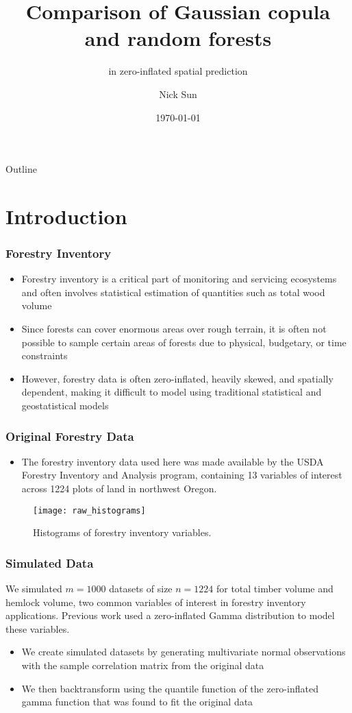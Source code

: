 \documentclass{beamer}
\title{Comparison of Gaussian copula and random forests}
\subtitle{in zero-inflated spatial prediction}
\author{Nick Sun}
\institute{Oregon State University, Department of Statistics}
\date{\today}
\begin{document}
\begin{frame}
\titlepage
\end{frame}

\begin{frame}{Outline}
	\tableofcontents
\end{frame}

\section{Introduction}
\begin{frame}
\frametitle{Forestry Inventory}
\begin{itemize}
	\item Forestry inventory is a critical part of monitoring and servicing ecosystems and often involves statistical estimation of quantities such as total wood volume
	\item Since forests can cover enormous areas over rough terrain, it is often not possible to sample certain areas of forests due to physical, budgetary, or time constraints
	\item However, forestry data is often zero-inflated, heavily skewed, and spatially dependent, making it difficult to model using traditional statistical and geostatistical models
\end{itemize}
\end{frame}

\begin{frame}
	\frametitle{Original Forestry Data}
	\begin{itemize}
		\item  The forestry inventory data used here was made available by the USDA Forestry Inventory and Analysis program, containing 13 variables of interest across 1224 plots of land in northwest Oregon.
	\end{itemize}
	\begin{center}
		\begin{figure}
		\texttt{[image: raw\_histograms]}
		\caption{Histograms of forestry inventory variables.}
		\end{figure}
	\end{center}
\end{frame}

\begin{frame}
	\frametitle{Simulated Data}
	We simulated $m=1000$ datasets of size $n=1224$ for total timber volume and hemlock volume, two common variables of interest in forestry inventory applications.
	Previous work used a zero-inflated Gamma distribution to model these variables\cite{madsen09}.
	\begin{itemize}
		\item We create simulated datasets by generating multivariate normal observations with the sample correlation matrix from the original data
		\item We then backtransform using the quantile function of the zero-inflated gamma function that was found to fit the original data
	\end{itemize}
\end{frame}
\end{document}
